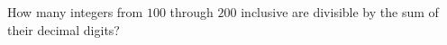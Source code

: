 How many integers from $100$ through $200$ inclusive are divisible by the sum of their decimal digits?
